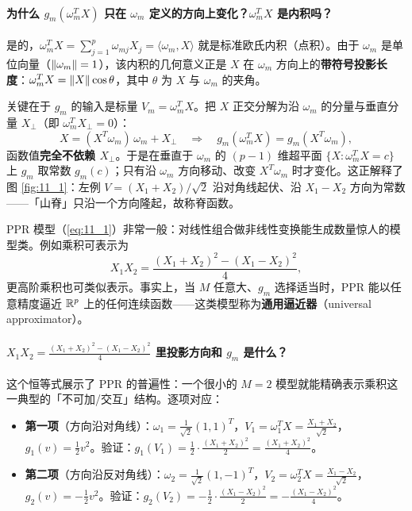 \paragraph{为什么 $g_m(\omega_m^T X)$ 只在 $\omega_m$ 定义的方向上变化？$\omega_m^T X$ 是内积吗？}

是的，$\omega_m^T X = \sum_{j=1}^p \omega_{mj} X_j = \langle \omega_m, X\rangle$ 就是标准欧氏内积（点积）。由于 $\omega_m$ 是单位向量（$\left\lVert\omega_m\right\rVert=1$），该内积的几何意义正是 $X$ 在 $\omega_m$ 方向上的\textbf{带符号投影长度}：$\omega_m^T X = \left\lVert X\right\rVert\cos\theta$，其中 $\theta$ 为 $X$ 与 $\omega_m$ 的夹角。

关键在于 $g_m$ 的输入是标量 $V_m = \omega_m^T X$。把 $X$ 正交分解为沿 $\omega_m$ 的分量与垂直分量 $X_\perp$（即 $\omega_m^T X_\perp = 0$）：
\[
X = (X^T\omega_m)\,\omega_m + X_\perp \quad\Longrightarrow\quad
g_m(\omega_m^T X) = g_m(X^T\omega_m),
\]
函数值\textbf{完全不依赖 $X_\perp$}。于是在垂直于 $\omega_m$ 的 $(p-1)$ 维超平面 $\{X : \omega_m^T X = c\}$ 上 $g_m$ 取常数 $g_m(c)$；只有沿 $\omega_m$ 方向移动、改变 $X^T\omega_m$ 时才变化。这正解释了图 \ref{fig:11_1}：左例 $V=(X_1+X_2)/\sqrt{2}$ 沿对角线起伏、沿 $X_1-X_2$ 方向为常数——「山脊」只沿一个方向隆起，故称脊函数。

\begin{remark}
PPR 模型（\ref{eq:11_1}）非常一般：对线性组合做非线性变换能生成数量惊人的模型类。例如乘积可表示为
\[
X_1 X_2 = \frac{(X_1+X_2)^2 - (X_1-X_2)^2}{4},
\]
更高阶乘积也可类似表示。事实上，当 $M$ 任意大、$g_m$ 选择适当时，PPR 能以任意精度逼近 $\mathbb{R}^p$ 上的任何连续函数——这类模型称为\textbf{通用逼近器}（universal approximator）。
\end{remark}

\paragraph{$X_1X_2 = \frac{(X_1+X_2)^2 - (X_1-X_2)^2}{4}$ 里投影方向和 $g_m$ 是什么？}

这个恒等式展示了 PPR 的普遍性：一个很小的 $M=2$ 模型就能精确表示乘积这一典型的「不可加/交互」结构。逐项对应：

\begin{itemize}
\item \textbf{第一项}（方向沿对角线）：$\omega_1 = \frac{1}{\sqrt2}(1,1)^T$，$V_1 = \omega_1^T X = \frac{X_1+X_2}{\sqrt2}$，$g_1(v) = \frac12 v^2$。验证：$g_1(V_1) = \frac12 \cdot \frac{(X_1+X_2)^2}{2} = \frac{(X_1+X_2)^2}{4}$。
\item \textbf{第二项}（方向沿反对角线）：$\omega_2 = \frac{1}{\sqrt2}(1,-1)^T$，$V_2 = \omega_2^T X = \frac{X_1-X_2}{\sqrt2}$，$g_2(v) = -\frac12 v^2$。验证：$g_2(V_2) = -\frac12 \cdot \frac{(X_1-X_2)^2}{2} = -\frac{(X_1-X_2)^2}{4}$。
\end{itemize}

